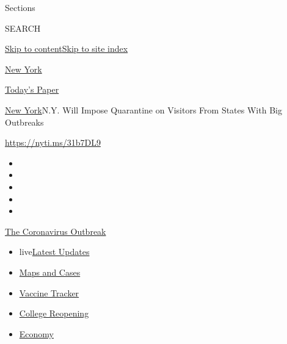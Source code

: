 Sections

SEARCH

\protect\hyperlink{site-content}{Skip to
content}\protect\hyperlink{site-index}{Skip to site index}

\href{https://www.nytimes3xbfgragh.onion/section/nyregion}{New York}

\href{https://myaccount.nytimes3xbfgragh.onion/auth/login?response_type=cookie\&client_id=vi}{}

\href{https://www.nytimes3xbfgragh.onion/section/todayspaper}{Today's
Paper}

\href{/section/nyregion}{New York}\textbar{}N.Y. Will Impose Quarantine
on Visitors From States With Big Outbreaks

\url{https://nyti.ms/31b7DL9}

\begin{itemize}
\item
\item
\item
\item
\item
\end{itemize}

\href{https://www.nytimes3xbfgragh.onion/news-event/coronavirus?action=click\&pgtype=Article\&state=default\&region=TOP_BANNER\&context=storylines_menu}{The
Coronavirus Outbreak}

\begin{itemize}
\tightlist
\item
  live\href{https://www.nytimes3xbfgragh.onion/2020/08/04/world/coronavirus-cases.html?action=click\&pgtype=Article\&state=default\&region=TOP_BANNER\&context=storylines_menu}{Latest
  Updates}
\item
  \href{https://www.nytimes3xbfgragh.onion/interactive/2020/us/coronavirus-us-cases.html?action=click\&pgtype=Article\&state=default\&region=TOP_BANNER\&context=storylines_menu}{Maps
  and Cases}
\item
  \href{https://www.nytimes3xbfgragh.onion/interactive/2020/science/coronavirus-vaccine-tracker.html?action=click\&pgtype=Article\&state=default\&region=TOP_BANNER\&context=storylines_menu}{Vaccine
  Tracker}
\item
  \href{https://www.nytimes3xbfgragh.onion/2020/08/02/us/covid-college-reopening.html?action=click\&pgtype=Article\&state=default\&region=TOP_BANNER\&context=storylines_menu}{College
  Reopening}
\item
  \href{https://www.nytimes3xbfgragh.onion/live/2020/08/04/business/stock-market-today-coronavirus?action=click\&pgtype=Article\&state=default\&region=TOP_BANNER\&context=storylines_menu}{Economy}
\end{itemize}


